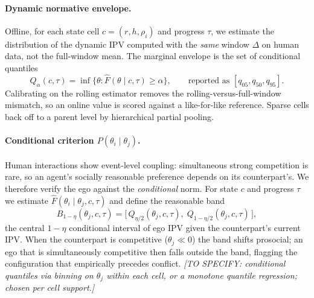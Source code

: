 \paragraph{Dynamic normative envelope.}
Offline, for each state cell $c=(r,h,\rho_i)$ and progress $\tau$, we estimate the
distribution of the dynamic IPV computed with the \emph{same} window $\Delta$ on human data,
not the full-window mean. The marginal envelope is the set of conditional quantiles
\begin{equation}
Q_\alpha(c,\tau)=\inf\{\theta:\hat F(\theta\mid c,\tau)\ge\alpha\},\qquad
\text{reported as } [q_{05},q_{50},q_{95}].
\end{equation}
Calibrating on the rolling estimator removes the rolling-versus-full-window mismatch, so an
online value is scored against a like-for-like reference. Sparse cells back off to a parent
level by hierarchical partial pooling.

\paragraph{Conditional criterion $P(\theta_i\mid\theta_j)$.}
Human interactions show event-level coupling: simultaneous strong competition is rare, so an
agent's socially reasonable preference depends on its counterpart's. We therefore verify the
ego against the \emph{conditional} norm. For state $c$ and progress $\tau$ we estimate
$\hat F(\theta_i\mid\theta_j,c,\tau)$ and define the reasonable band
\begin{equation}
B_{1-\eta}(\theta_j,c,\tau)=\bigl[\,Q_{\eta/2}(\theta_j,c,\tau),\;Q_{1-\eta/2}(\theta_j,c,\tau)\,\bigr],
\end{equation}
the central $1-\eta$ conditional interval of ego IPV given the counterpart's current IPV.
When the counterpart is competitive ($\theta_j\ll0$) the band shifts prosocial; an ego that
is simultaneously competitive then falls outside the band, flagging the configuration that
empirically precedes conflict.
\emph{[TO SPECIFY: conditional quantiles via binning on $\theta_j$ within each cell, or a
monotone quantile regression; chosen per cell support.]}

